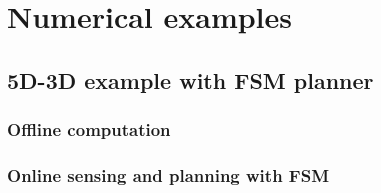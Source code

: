 \section{Numerical examples}

\subsection{5D-3D example with FSM planner \label{sec:reach_planner}}

\subsubsection{Offline computation}
\subsubsection{Online sensing and planning with FSM }

